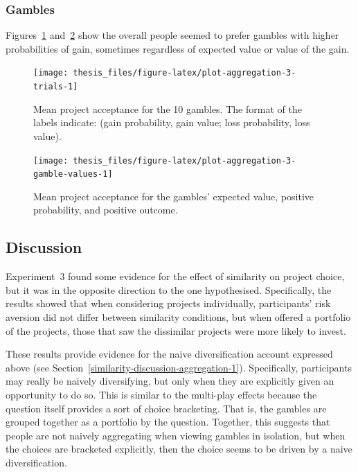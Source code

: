\documentclass[a4paper, nobind, dvipsnames]{templates/ociamthesis}
\theoremstyle{definition}
\theoremstyle{definition}
\theoremstyle{definition}
\theoremstyle{definition}
\theoremstyle{remark}
\begin{document}
\subsubsection{Gambles}

Figures~\ref{fig:plot-aggregation-3-trials}
and~\ref{fig:plot-aggregation-3-gamble-values} show the
overall people seemed to prefer gambles with higher probabilities of gain,
sometimes regardless of expected value or value of the gain.



\begin{figure}
\texttt{[image: thesis\_files/figure-latex/plot-aggregation-3-trials-1]} \caption{Mean project acceptance for the 10 gambles. The format of the labels indicate: (gain probability, gain value; loss probability, loss value).}\label{fig:plot-aggregation-3-trials}
\end{figure}




\begin{figure}
\texttt{[image: thesis\_files/figure-latex/plot-aggregation-3-gamble-values-1]} \caption{Mean project acceptance for the gambles'
expected value, positive probability, and positive outcome.}\label{fig:plot-aggregation-3-gamble-values}
\end{figure}

\subsection{Discussion}

Experiment~3 found some evidence for the effect of similarity on project choice,
but it was in the opposite direction to the one hypothesised. Specifically, the
results showed that when considering projects individually, participants' risk
aversion did not differ between similarity conditions, but when offered a
portfolio of the projects, those that saw the dissimilar projects were more
likely to invest.

These results provide evidence for the naive diversification account expressed
above (see Section~\ref{similarity-discussion-aggregation-1}). Specifically,
participants may really be naively diversifying, but only when they are
explicitly given an opportunity to do so. This is similar to the multi-play
effects because the question itself provides a sort of choice bracketing. That
is, the gambles are grouped together as a portfolio by the question. Together,
this suggests that people are not naively aggregating when viewing gambles in
isolation, but when the choices are bracketed explicitly, then the choice seems
to be driven by a naive diversification.
\end{document}
